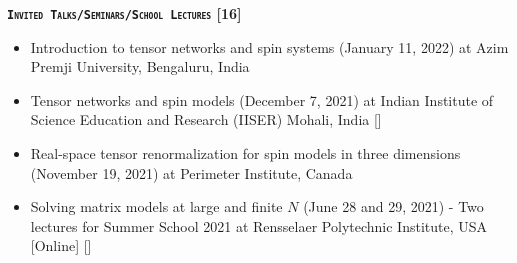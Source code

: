 \vspace{2mm} 
\textcolor{alizarin}{\textbf{\textsc{\fontsize{10}{38} \bfseries \texttt{Invited Talks/Seminars/School Lectures} [16]}}}

\begin{itemize}
 \item Introduction to tensor networks and spin systems 
 (January 11, 2022) at Azim Premji University, Bengaluru, India  \vspace{1mm} 
 \item Tensor networks and spin models 
 (December 7, 2021) at Indian Institute of Science Education and Research (IISER) Mohali, India 
 [\texttt{\textbf{}}]  \vspace{1mm} 
  \item Real-space tensor renormalization for spin models in three dimensions 
 (November 19, 2021) at Perimeter Institute, Canada \vspace{1mm}  
 \item Solving matrix models at large and finite $N$ (June 28 and 29, 2021) - Two lectures for 
Summer School 2021 at Rensselaer Polytechnic Institute, USA [Online]  
  [\texttt{\textbf{}}] \vspace{1mm} 
 

\end{itemize}
